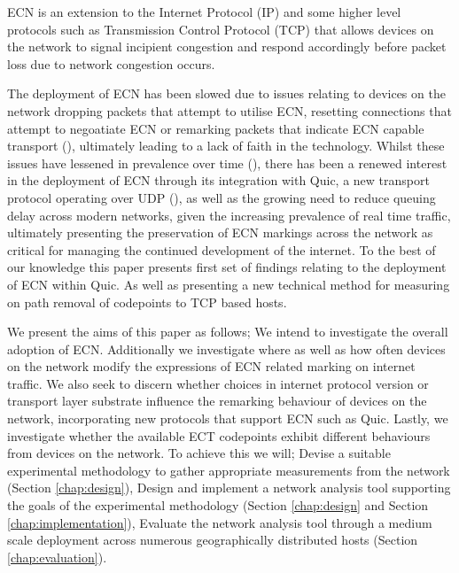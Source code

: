 \documentclass{l4proj}
\begin{document}
ECN is an extension to the Internet Protocol (IP) and some higher level protocols such as Transmission Control Protocol (TCP) that allows devices on the network to signal incipient congestion and respond accordingly before packet loss due to network congestion occurs.

The deployment of ECN has been slowed due to issues relating to devices on the network dropping packets that attempt to utilise ECN, resetting connections that attempt to negoatiate ECN or remarking packets that indicate ECN capable transport (\cite{floyd_inappropriate_2002}), ultimately leading to a lack of faith in the technology. Whilst these issues have lessened in prevalence over time (\cite{trammell_enabling_2015}), there has been a renewed interest in the deployment of ECN through its integration with Quic, a new transport protocol operating over UDP (\cite{johansson_ecn_2017}), as well as the growing need to reduce queuing delay across modern networks, given the increasing prevalence of real time traffic, ultimately presenting the preservation of ECN markings across the network as critical for managing the continued development of the internet. To the best of our knowledge this paper presents first set of findings relating to the deployment of ECN within Quic. As well as presenting a new technical method for measuring on path removal of codepoints to TCP based hosts.



We present the aims of this paper as follows; We intend to investigate the overall adoption of ECN. Additionally we investigate where as well as how often devices on the network modify the expressions of ECN related marking on internet traffic. We also seek to discern whether choices in internet protocol version or transport layer substrate influence the remarking behaviour of devices on the network, incorporating new protocols that support ECN such as Quic. Lastly, we investigate whether the available ECT codepoints exhibit different behaviours from devices on the network. To achieve this we will; Devise a suitable experimental methodology to gather appropriate measurements from the network (Section \ref{chap:design}), Design and implement a network analysis tool supporting the goals of the experimental methodology (Section \ref{chap:design} and Section \ref{chap:implementation}), Evaluate the network analysis tool through a medium scale deployment across numerous geographically distributed hosts (Section \ref{chap:evaluation}).

\clearpage
\end{document}
